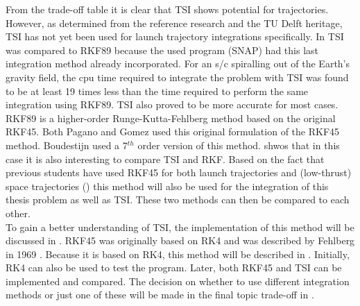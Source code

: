 From the trade-off table it is clear that \ac{TSI} shows potential for trajectories. However, as determined from the reference research and the TU Delft heritage, \ac{TSI} has not yet been used for launch trajectory integrations specifically. In \cite{scott2008high} \ac{TSI} was compared to RKF89 because the used program (SNAP) had this last integration method already incorporated. For an \ac{s/c} spiralling out of the Earth's gravity field, the cpu time required to integrate the problem with \ac{TSI} was found to be at least 19 times less than the time required to perform the same integration using RKF89. \ac{TSI} also proved to be more accurate for most cases.\\
RKF89 is a higher-order Runge-Kutta-Fehlberg method based on the original \ac{RKF45}. Both Pagano and Gomez used this original formulation of the \ac{RKF45} method. Boudestijn used a 7$^{th}$ order version of this method.  shwos that in this case it is also interesting to compare \ac{TSI} and RKF. Based on the fact that previous students have used \ac{RKF45} for both launch trajectories and (low-thrust) space trajectories (\cite{pagano2010global,gomez2015optimization}) this method will also be used for the integration of this thesis problem as well as \ac{TSI}. These two methods can then be compared to each other. \\
To gain a better understanding of \ac{TSI}, the implementation of this method will be discussed in . \ac{RKF45} was originally based on \ac{RK4} and was described by Fehlberg in 1969 \cite{fehlberg1969}. Because it is based on \ac{RK4}, this method will be described in . Initially, \ac{RK4} can also be used to test the program. Later, both \ac{RKF45} and \ac{TSI} can be implemented and compared. The decision on whether to use different integration methods or just one of these will be made in the final topic trade-off in .

